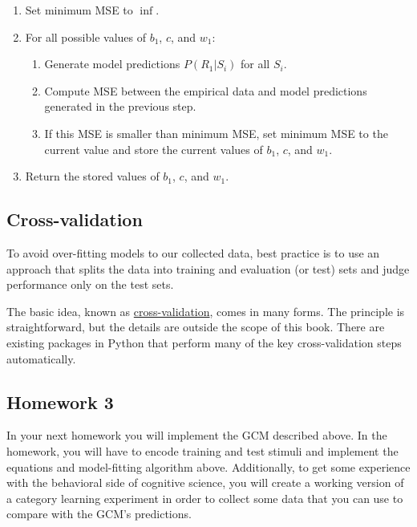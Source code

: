 \documentclass[
  letterpaper,
  DIV=11,
  numbers=noendperiod]{scrreprt}
\makeatletter
\newcommand*\pandocbounded[1]{%
  \sbox\pandoc@box{#1}%
  \Gscale@div\@tempa{\textheight}{\dimexpr\ht\pandoc@box+\dp\pandoc@box\relax}%
  \Gscale@div\@tempb{\linewidth}{\wd\pandoc@box}%
  \ifdim\@tempb\p@<\@tempa\p@\let\@tempa\@tempb\fi%
  \ifdim\@tempa\p@<\p@\scalebox{\@tempa}{\usebox\pandoc@box}%
  \else\usebox{\pandoc@box}%
  \fi%
}
\providecommand{\tightlist}{%
  \setlength{\itemsep}{0pt}\setlength{\parskip}{0pt}}
\makeatother
\begin{document}
\begin{enumerate}
\def\labelenumi{\arabic{enumi}.}
\tightlist
\item
  Set minimum MSE to \(\inf\).
\item
  For all possible values of \(b_1\), \(c\), and \(w_1\):

  \begin{enumerate}
  \def\labelenumii{\arabic{enumii}.}
  \tightlist
  \item
    Generate model predictions \(P(R_1|S_i)\) for all \(S_i\).
  \item
    Compute MSE between the empirical data and model predictions
    generated in the previous step.
  \item
    If this MSE is smaller than minimum MSE, set minimum MSE to the
    current value and store the current values of \(b_1\), \(c\), and
    \(w_1\).
  \end{enumerate}
\item
  Return the stored values of \(b_1\), \(c\), and \(w_1\).
\end{enumerate}

\subsection{Cross-validation}\label{cross-validation}

To avoid over-fitting models to our collected data, best practice is to
use an approach that splits the data into training and evaluation (or
test) sets and judge performance only on the test sets.

The basic idea, known as
\href{https://en.wikipedia.org/wiki/Cross-validation_(statistics)}{cross-validation},
comes in many forms. The principle is straightforward, but the details
are outside the scope of this book. There are existing packages in
Python that perform many of the key cross-validation steps
automatically.

\subsection{Homework 3}\label{homework-3}

\href{https://colab.research.google.com/drive/140NfyG4UV1au0722KIy54-o0f62Ifp2u?usp=sharing}{\pandocbounded{}}

In your next homework you will implement the GCM described above. In the
homework, you will have to encode training and test stimuli and
implement the equations and model-fitting algorithm above. Additionally,
to get some experience with the behavioral side of cognitive science,
you will create a working version of a category learning experiment in
order to collect some data that you can use to compare with the GCM's
predictions.
\end{document}
